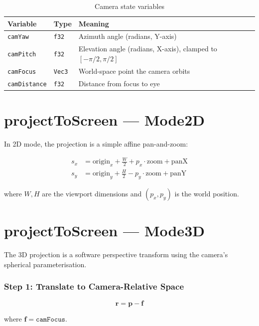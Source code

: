\documentclass[12pt, a4paper]{report}
\theoremstyle{definition}
\theoremstyle{remark}
\begin{document}
\begin{table}[H]
\centering
\caption{Camera state variables}
\begin{tabular}{lll}
\toprule
\textbf{Variable} & \textbf{Type} & \textbf{Meaning} \\
\midrule
\texttt{camYaw}      & \texttt{f32} & Azimuth angle (radians, Y-axis) \\
\texttt{camPitch}    & \texttt{f32} & Elevation angle (radians, X-axis), clamped to $[-\pi/2, \pi/2]$ \\
\texttt{camFocus}    & \texttt{Vec3} & World-space point the camera orbits \\
\texttt{camDistance} & \texttt{f32} & Distance from focus to eye \\
\bottomrule
\end{tabular}
\end{table}

\section{projectToScreen — Mode2D}

In 2D mode, the projection is a simple affine pan-and-zoom:

\begin{align}
  s_x &= \text{origin}_x + \frac{W}{2} + p_x \cdot \text{zoom} + \text{panX} \\
  s_y &= \text{origin}_y + \frac{H}{2} - p_y \cdot \text{zoom} + \text{panY}
\end{align}

where $W, H$ are the viewport dimensions and $(p_x, p_y)$ is the world
position.

\section{projectToScreen — Mode3D}

The 3D projection is a software perspective transform using the
camera's spherical parameterisation.

\subsubsection{Step 1: Translate to Camera-Relative Space}

\begin{equation}
\mathbf{r} = \mathbf{p} - \mathbf{f}
\end{equation}

where $\mathbf{f} = \texttt{camFocus}$.
\end{document}
